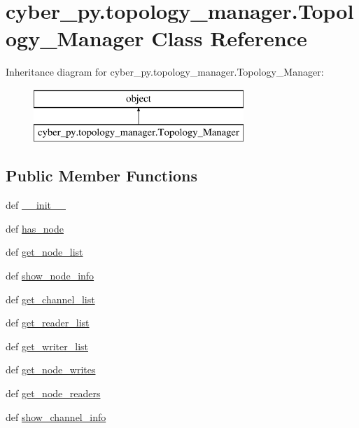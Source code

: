 \hypertarget{classcyber__py_1_1topology__manager_1_1Topology__Manager}{\section{cyber\-\_\-py.\-topology\-\_\-manager.\-Topology\-\_\-\-Manager Class Reference}
\label{classcyber__py_1_1topology__manager_1_1Topology__Manager}
}
Inheritance diagram for cyber\-\_\-py.\-topology\-\_\-manager.\-Topology\-\_\-\-Manager\-:\begin{figure}[H]
\begin{center}
\leavevmode
\includegraphics[height=2.000000cm]{classcyber__py_1_1topology__manager_1_1Topology__Manager}
\end{center}
\end{figure}
\subsection*{Public Member Functions}
\begin{DoxyCompactItemize}
\item 
def \hyperlink{classcyber__py_1_1topology__manager_1_1Topology__Manager_ab37f7a6c4197cf76f2a81da0ff0e83bc}{\-\_\-\-\_\-init\-\_\-\-\_\-}
\item 
def \hyperlink{classcyber__py_1_1topology__manager_1_1Topology__Manager_ae7b2631f17ffedd9d698609b23e49f8d}{has\-\_\-node}
\item 
def \hyperlink{classcyber__py_1_1topology__manager_1_1Topology__Manager_abcda716e82b70b85b068a08fbed9e853}{get\-\_\-node\-\_\-list}
\item 
def \hyperlink{classcyber__py_1_1topology__manager_1_1Topology__Manager_ab9299e6e3256eb8d6bace673c853bed5}{show\-\_\-node\-\_\-info}
\item 
def \hyperlink{classcyber__py_1_1topology__manager_1_1Topology__Manager_a6f39bf42627ff93b6a24372d721aa0ac}{get\-\_\-channel\-\_\-list}
\item 
def \hyperlink{classcyber__py_1_1topology__manager_1_1Topology__Manager_ac7200a996903f31bf38449997b6bac56}{get\-\_\-reader\-\_\-list}
\item 
def \hyperlink{classcyber__py_1_1topology__manager_1_1Topology__Manager_a9751fb4d8f196441da0552989c4dd47d}{get\-\_\-writer\-\_\-list}
\item 
def \hyperlink{classcyber__py_1_1topology__manager_1_1Topology__Manager_a6c1f7da4d2d899335824b25c70691348}{get\-\_\-node\-\_\-writes}
\item 
def \hyperlink{classcyber__py_1_1topology__manager_1_1Topology__Manager_a9d148e3c73f5323b18476974dd15f8da}{get\-\_\-node\-\_\-readers}
\item 
def \hyperlink{classcyber__py_1_1topology__manager_1_1Topology__Manager_a60bf7535b5c2634cf696e91e78f9ba21}{show\-\_\-channel\-\_\-info}
\end{DoxyCompactItemize}
